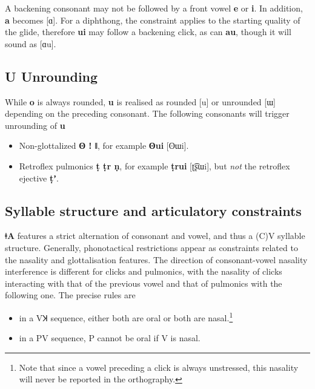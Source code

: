 \documentclass[11pt,a5paper]{book}
\newcommand{\qcn}[1]{\textcolor{AccentText}{\large\textbf{#1}}}
\newcommand{\langname}{\qcn{ǂA}}
\begin{document}
A backening consonant may not be followed by a front vowel \qcn{e} or \qcn{i}. In addition, \qcn{a} becomes [ɑ].  For a diphthong, the constraint applies to the starting quality of the glide, therefore \qcn{ui} may follow a backening click, as can \qcn{au}, though it will sound as [ɑu].

\subsection{U Unrounding}\label{sec:uunrounding}

While \qcn{o} is always rounded, \qcn{u} is realised as rounded [u] or unrounded [ɯ] depending on the preceding consonant. The following consonants will trigger unrounding of \qcn{u}

\begin{itemize}
	\item Non-glottalized \qcn{ʘ ǃ ǁ}, for example \qcn{ʘui} [ʘɯi].
	\item Retroflex pulmonics \qcn{ṭ ṭr ṇ}, for example \qcn{ṭrui} [ʈ͡ʂɯi], but \emph{not} the retroflex ejective \qcn{ṭʼ}.
\end{itemize}

\subsection{Syllable structure and articulatory constraints}\label{sec:syllables}

\langname{} features a strict alternation of consonant and vowel, and thus a (C)V syllable structure. Generally, phonotactical restrictions appear as constraints related to the nasality and glottalisation features. The direction of consonant-vowel nasality interference is different for clicks and pulmonics, with the nasality of clicks interacting with that of the previous vowel and that of pulmonics with the following one. The precise rules are

\begin{itemize}
	\item in a VꞰ sequence, either both are oral or both are nasal.\footnote{Note that since a vowel preceding a click is always unstressed, this nasality will never be reported in the orthography.}
	\item in a PV sequence, P cannot be oral if V is nasal.
\end{itemize}
\end{document}
